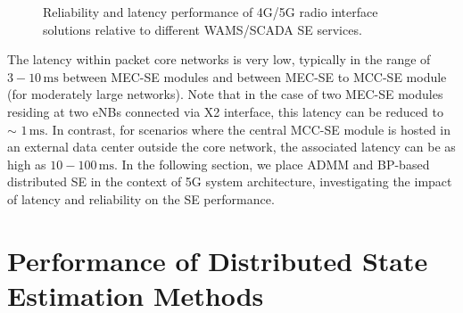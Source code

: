 \documentclass[journal]{IEEEtran}
\begin{document}
\begin{figure}[ht]
	\caption{Reliability and latency performance of 4G/5G radio 
	interface solutions relative to different WAMS/SCADA SE services.}
	\label{fig_var}
	\end{figure}

The latency within packet core networks is very low, typically in the range of $3-10\,\mathrm{ms}$ between MEC-SE modules and between MEC-SE to MCC-SE module (for moderately large networks). Note that in the case of two MEC-SE modules residing at two eNBs connected via X2 interface, this latency can be reduced to $\sim$ $1\,\mathrm{ms}$. In contrast, for scenarios where the central MCC-SE module is hosted in an external data center outside the core network, the associated latency can be as high as $10-100\,\mathrm{ms}$. In the following section, we place ADMM and BP-based distributed SE in the context of 5G system architecture, investigating the impact of latency and reliability on the SE performance.

\section{Performance of Distributed State Estimation Methods}
\end{document}
